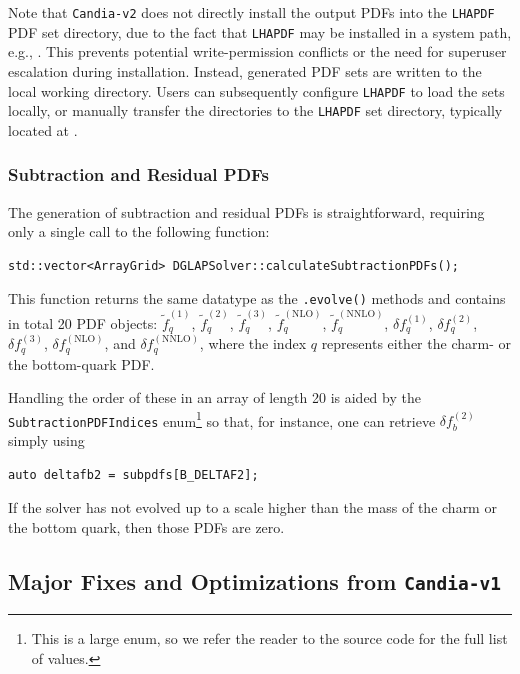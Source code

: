 \documentclass[preprint,12pt]{elsarticle}
\begin{document}
Note that \texttt{Candia-v2} does not directly install the output PDFs into the \texttt{LHAPDF} PDF set directory, due to the fact that \texttt{LHAPDF} may be installed in a system path, e.g., . This prevents potential write-permission conflicts or the need for superuser escalation during installation. Instead, generated PDF sets are written to the local working directory. Users can subsequently configure \texttt{LHAPDF} to load the sets locally, or manually transfer the directories to the \texttt{LHAPDF} set directory, typically located at .

\subsubsection{Subtraction and Residual PDFs}
\label{subsec:subpdf-access}

The generation of subtraction and residual PDFs is straightforward, requiring only a single call to the following function:

\begin{verbatim}
std::vector<ArrayGrid> DGLAPSolver::calculateSubtractionPDFs();
\end{verbatim}

This function returns the same datatype as the \texttt{.evolve()} methods and contains in total 20 PDF objects: $\tilde{f}_q^{(1)}$, $\tilde{f}_q^{(2)}$, $\tilde{f}_q^{(3)}$, $\tilde{f}_q^{(\mathrm{NLO})}$, $\tilde{f}_q^{(\mathrm{NNLO})}$, ${\delta}f_q^{(1)}$, ${\delta}f_q^{(2)}$, ${\delta}f_q^{(3)}$, ${\delta}f_q^{(\mathrm{NLO})}$, and ${\delta}f_q^{(\mathrm{NNLO})}$, where the index $q$ represents either the charm- or the bottom-quark PDF.

Handling the order of these in an array of length 20 is aided by the \texttt{SubtractionPDFIndices} enum\footnote{This is a large enum, so we refer the reader to the source code for the full list of values.} so that, for instance, one can retrieve ${\delta}f_b^{(2)}$ simply using 

\begin{verbatim}
auto deltafb2 = subpdfs[B_DELTAF2];
\end{verbatim}

If the solver has not evolved up to a scale higher than the mass of the charm or the bottom quark, then those PDFs are zero.


\subsection{Major Fixes and Optimizations from \texorpdfstring{\texttt{Candia-v1}}{Candia-v1}}
\label{subsec:optims}
\end{document}
